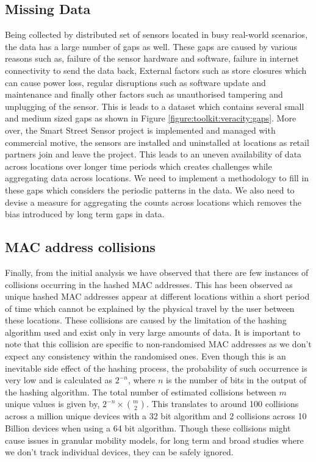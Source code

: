 \subsection{Missing Data}
Being collected by distributed set of sensors located in busy real-world scenarios, the data has a large number of gaps as well.
These gaps are caused by various reasons such as, failure of the sensor hardware and software, failure in internet connectivity to send the data back, External factors such as store closures which can cause power loss, regular disruptions such as software update and maintenance and finally other factors such as unauthorised tampering and unplugging of the sensor.
This is leads to a dataset which contains several small and medium sized gaps as shown in Figure \ref{figure:toolkit:veracity:gaps}.
More over, the Smart Street Sensor project is implemented and managed with commercial motive, the sensors are installed and uninstalled at locations as retail partners join and leave the project.
This leads to an uneven availability of data across locations over longer time periods which creates challenges while aggregating data across locations.
We need to implement a methodology to fill in these gaps which considers the periodic patterns in the data.
We also need to devise a measure for aggregating the counts across locations which removes the bias introduced by long term gaps in data.

\subsection{MAC address collisions}
Finally, from the initial analysis we have observed that there are few instances of collisions occurring in the hashed MAC addresses.
This has been observed as unique hashed MAC addresses appear at different locations within a short period of time which cannot be explained by the physical travel by the user between these locations.
These collisions are caused by the limitation of the hashing algorithm used and exist only in very large amounts of data.
It is important to note that this collision are specific to non-randomised MAC addresses as we don't expect any consistency within the randomised ones.
Even though this is an inevitable side effect of the hashing process, the probability of such occurrence is very low and is calculated as \(2^{-n}\), where \(n\) is the number of bits in the output of the hashing algorithm.
The total number of estimated collisions between \(m\) unique values is given by, \(2^{-n} \times {m \choose 2}\)\cite{estcollision}.
This translates to around 100 collisions across a million unique devices with a 32 bit algorithm and 2 collisions across 10 Billion devices when using a 64 bit algorithm. 
Though these collisions might cause issues in granular mobility models, for long term and broad studies where we don't track individual devices, they can be safely ignored.
